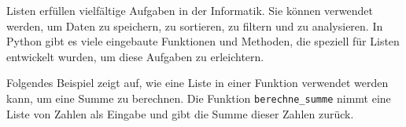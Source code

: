 Listen erfüllen vielfältige Aufgaben in der Informatik. Sie können verwendet werden, um Daten zu speichern, zu sortieren, zu filtern und zu analysieren. In Python gibt es viele eingebaute Funktionen und Methoden, die speziell für Listen entwickelt wurden, um diese Aufgaben zu erleichtern.
\begin{myexample}\label{myexample:summe}
	Folgendes Beispiel zeigt auf, wie eine Liste in einer Funktion verwendet werden kann, um eine Summe zu berechnen. Die Funktion \lstinline|berechne_summe| nimmt eine Liste von Zahlen als Eingabe und gibt die Summe dieser Zahlen zurück.

	\begin{minipage}{\linewidth}
		
	\end{minipage}
\end{myexample}

